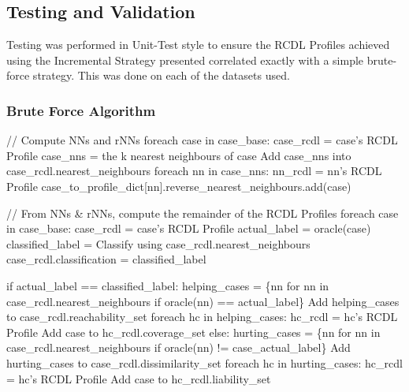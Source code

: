 \documentclass[a4paper,11pt]{report}
\begin{document}
\subsection{Testing and Validation}
Testing was performed in Unit-Test style to ensure the RCDL Profiles achieved using the Incremental Strategy presented correlated exactly with a simple brute-force strategy. This was done on each of the datasets used.

\vspace{10pt}

\begin{samepage}
\subsubsection{Brute Force Algorithm}
\begin{code}
// Compute NNs and rNNs
foreach case in case_base:
  case_rcdl = case's RCDL Profile
  case_nns = the k nearest neighbours of case
  Add case_nns into case_rcdl.nearest_neighbours
  foreach nn in case_nns:
    nn_rcdl = nn's RCDL Profile
    case_to_profile_dict[nn].reverse_nearest_neighbours.add(case)

// From NNs & rNNs, compute the remainder of the RCDL Profiles
foreach case in case_base:
  case_rcdl = case's RCDL Profile
  actual_label = oracle(case)
  classified_label = Classify using case_rcdl.nearest_neighbours
  case_rcdl.classification = classified_label
  
  if actual_label == classified_label:
    helping_cases = \{nn for nn in case_rcdl.nearest_neighbours 
                     if oracle(nn) == actual_label\}
    Add helping_cases to case_rcdl.reachability_set
    foreach hc in helping_cases:
      hc_rcdl = hc's RCDL Profile
      Add case to hc_rcdl.coverage_set
  else:
    hurting_cases = \{nn for nn in case_rcdl.nearest_neighbours 
                     if oracle(nn) != case_actual_label\}
    Add hurting_cases to case_rcdl.dissimilarity_set
    foreach hc in hurting_cases:
      hc_rcdl = hc's RCDL Profile
      Add case to hc_rcdl.liability_set
\end{code}
\end{samepage}

\medspace
\vspace{10pt}

\pagebreak
\end{document}
